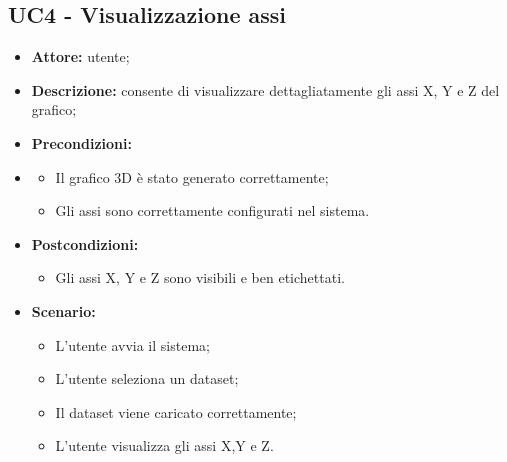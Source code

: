 \subsection{UC4 - Visualizzazione assi}
\begin{itemize}
    \item \textbf{Attore:} utente;
    \item \textbf{Descrizione:} consente di visualizzare dettagliatamente gli assi X, Y e Z del grafico;
    \item \textbf{Precondizioni:} 
    \item \begin{itemize}
        \item Il grafico 3D è stato generato correttamente;
        \item Gli assi sono correttamente configurati nel sistema.
    \end{itemize}
    \item \textbf{Postcondizioni:}
    \begin{itemize}
        \item Gli assi X, Y e Z sono visibili e ben etichettati.
    \end{itemize}
    \item \textbf{Scenario:}
    \begin{itemize}
        \item L'utente avvia il sistema;
        \item L'utente seleziona un dataset;
        \item Il dataset viene caricato correttamente;
        \item L'utente visualizza gli assi X,Y e Z.
    \end{itemize}

\end{itemize}
